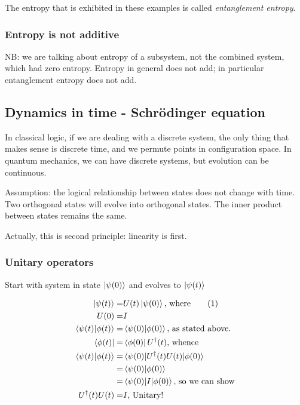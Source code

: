 \documentclass[]{article}
\newcommand\numberthis{\addtocounter{equation}{1}\tag{\theequation}}
\begin{document}
The entropy that is exhibited in these examples is called \emph{entanglement entropy}. 



\subsubsection{Entropy is not additive}

NB: we are talking about entropy of a subsystem, not the combined system, which had zero entropy. Entropy in general does not add; in particular entanglement entropy does not add.

\subsection{Dynamics in time - Schr\"odinger equation}

In classical logic, if we are dealing with a discrete system, the only thing that makes sense is discrete time, and we permute points in configuration space. In quantum mechanics, we can have discrete systems, but evolution can be continuous.

Assumption: the logical relationship between states does not change with time. Two orthogonal states will evolve into orthogonal states. The inner product between states remains the same.

Actually, this is second principle: linearity is first.


\subsubsection{Unitary operators}\label{sect:unitary}

Start with system in state $\ket{\psi(0)}$ and evolves to $\ket{\psi(t)}$

\begin{align*}
	\ket{\psi(t)} =& U(t) \ket{\psi(0)} \text{, where} \numberthis \label{eq:evolution_time}\\
	U(0) =& I\\
	\braket{\psi(t)\vert\phi(t)} =& \braket{\psi(0)\vert\phi(0)} \text{, as stated above.}\\
	\bra{\phi(t)} =& \bra{\phi(0)} U^\dagger(t) \text{, whence}\\
	\braket{\psi(t)\vert\phi(t)} =& \braket{\psi(0)\vert U^\dagger(t) U(t)\vert\phi(0)}\\
	=& \braket{\psi(0)\vert\phi(0)} \\
	=& \braket{\psi(0)\vert I \vert \phi(0)} \text{, so we can show}\\
	 U^\dagger(t) U(t)=& I \text {, Unitary!}
\end{align*}
\end{document}
